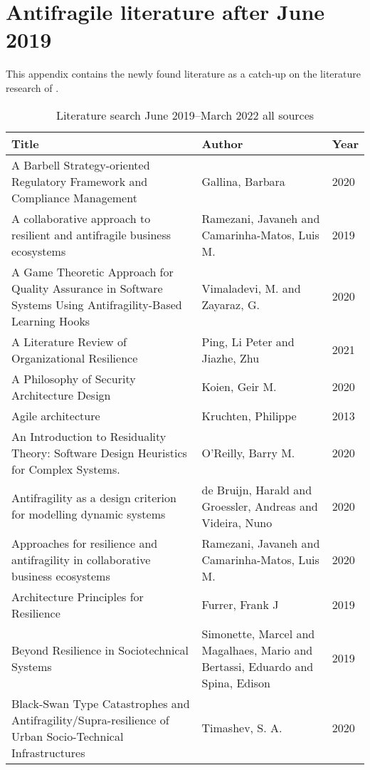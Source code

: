 \chapter{Antifragile literature after June 2019}
\label{app:literaturecatchup}
This appendix contains the newly found literature as a catch-up on the literature research of \textcite{Botjes2020}.

\begin{longtable}{p{}p{}p{}}
	\toprule%
	\textbf{Title} & \textbf{Author} & \textbf{Year} \\
	\midrule%
	\endhead%
	\hline
	\endfoot%
	\caption[Literature search June 2019--March 2022 all sources]{Literature search June 2019--March 2022 all sources}
	\label{tab:literatureafter2020all}
	\endlastfoot%
		A Barbell Strategy-oriented Regulatory Framework and Compliance Management & Gallina, Barbara & 2020 \\
		A collaborative approach to resilient and antifragile business ecosystems & Ramezani, Javaneh and Camarinha-Matos, Luis M. & 2019 \\
		A Game Theoretic Approach for Quality Assurance in Software Systems Using Antifragility-Based Learning Hooks & Vimaladevi, M. and Zayaraz, G. & 2020 \\
		A Literature Review of Organizational Resilience & Ping, Li Peter and Jiazhe, Zhu & 2021 \\
		A Philosophy of Security Architecture Design & Koien, Geir M. & 2020 \\
		Agile architecture & Kruchten, Philippe & 2013 \\
		An Introduction to Residuality Theory: Software Design Heuristics for Complex Systems. & O'Reilly, Barry M. & 2020 \\
		Antifragility as a design criterion for modelling dynamic systems & de Bruijn, Harald and Groessler, Andreas and Videira, Nuno & 2020 \\
		Approaches for resilience and antifragility in collaborative business ecosystems & Ramezani, Javaneh and Camarinha-Matos, Luis M. & 2020 \\
		Architecture Principles for Resilience & Furrer, Frank J & 2019 \\
		Beyond Resilience in Sociotechnical Systems & Simonette, Marcel and Magalhaes, Mario and Bertassi, Eduardo and Spina, Edison & 2019 \\
		Black-Swan Type Catastrophes and Antifragility/Supra-resilience of Urban Socio-Technical Infrastructures & Timashev, S. A. & 2020 \\

\end{longtable}
